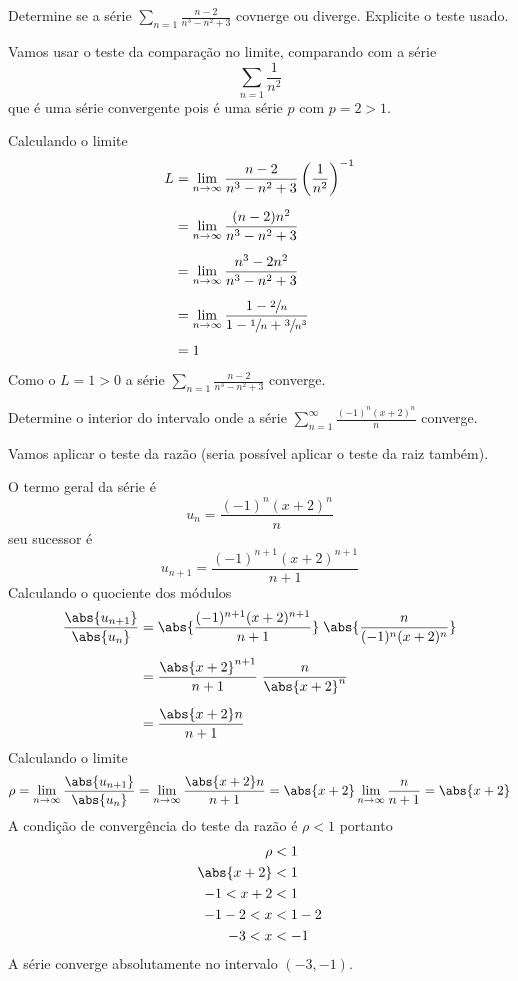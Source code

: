 \documentclass[a4paper,12pt,fleqn]{article}
\begin{document}

Determine se a série
\(
  \sum_{n=1} \frac{n-2}{n^3-n^2+3}
\)
covnerge ou diverge.
Explicite o teste usado.

\begin{answer}
  Vamos usar o teste da comparação no limite, comparando com a série
  \[
    \sum_{n=1} \frac{1}{n^2}
  \]
  que é uma série convergente pois é uma série $p$ com $p=2>1$.

  \vspace{\baselineskip}
  Calculando o limite
  \begin{align*}
    L
    & = \lim_{n\to\infty} \frac{n-2}{n^3-n^2+3} \left(\frac{1}{n^2}\right)^{-1} \\[2mm]
    & = \lim_{n\to\infty} \frac{(n-2)n^2}{n^3-n^2+3} \\[2mm]
    & = \lim_{n\to\infty} \frac{n^3-2n^2}{n^3-n^2+3} \\[2mm]
    & = \lim_{n\to\infty} \frac{1-\sfrac{2}{n}}{1-\sfrac{1}{n}+\sfrac{3}{n^3}} \\[2mm]
    & = 1
  \end{align*}

  Como o $L=1>0$ a série
  \(
    \sum_{n=1} \frac{n-2}{n^3-n^2+3}
  \)
  converge.
  \clearpage
\end{answer}

Determine o interior do intervalo onde a série
\(
  \sum_{n=1}^\infty \frac{(-1)^n(x+2)^n}{n}
\)
converge.

\begin{answer}
  Vamos aplicar o teste da razão (seria possível aplicar o teste da raiz também).

  O termo geral da série é
  \[
    u_n = \frac{(-1)^n(x+2)^n}{n}
  \]
  seu sucessor é
  \[
    u_{n+1} = \frac{(-1)^{n+1}(x+2)^{n+1}}{n+1}
  \]
  Calculando o quociente dos módulos
  \begin{align*}
    \frac{\abs{u_{n+1}}}{\abs{u_n}}
    & = \abs{\frac{(-1)^{n+1}(x+2)^{n+1}}{n+1}} \; \abs{\frac{n}{(-1)^n(x+2)^n}} \\[2mm]
    & = \frac{\abs{x+2}^{n+1}}{n+1} \; \frac{n}{\abs{x+2}^n} \\[2mm]
    & = \frac{\abs{x+2}n}{n+1}
  \end{align*}
  Calculando o limite
  \[
    \rho
    = \lim_{n\to\infty} \frac{\abs{u_{n+1}}}{\abs{u_n}}
    = \lim_{n\to\infty} \frac{\abs{x+2}n}{n+1}
    = \abs{x+2} \lim_{n\to\infty} \frac{n}{n+1}
    = \abs{x+2}
  \]
  A condição de convergência do teste da razão é $\rho<1$ portanto
  \begin{align*}
    \rho & < 1 \\
    \abs{x+2} & < 1 \\
    -1 < x+2 & < 1 \\
    -1 -2 < x & < 1 - 2 \\
    -3 < x & < -1
  \end{align*}
  A série converge absolutamente no intervalo \((-3, -1)\).
  \clearpage
\end{answer}
\end{document}
